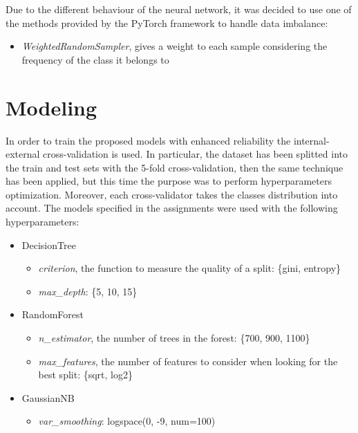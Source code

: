 \documentclass[../main]{subfiles}
\begin{document}
Due to the different behaviour of the neural network, it was decided to use one of the methods provided by the PyTorch framework to handle data imbalance:
\begin{itemize}
    \item \textit{WeightedRandomSampler}, gives a weight to each sample considering the frequency of the class it belongs to
\end{itemize}

\section{Modeling}
In order to train the proposed models with enhanced reliability the internal-external cross-validation is used.
In particular, the dataset has been splitted into the train and test sets with the 5-fold cross-validation, then the same technique has been applied, but this time the purpose was to perform hyperparameters optimization.
Moreover, each cross-validator takes the classes distribution into account.
The models specified in the assignments were used with the following hyperparameters:
\begin{itemize}
    \item DecisionTree
    \begin{itemize}
        \item \textit{criterion}, the function to measure the quality of a split: \{gini, entropy\}
        \item \textit{max\_depth}: \{5, 10, 15\}
    \end{itemize}
    \item RandomForest
    \begin{itemize}
        \item \textit{n\_estimator}, the number of trees in the forest: \{700, 900, 1100\}
        \item \textit{max\_features}, the number of features to consider when looking for the best split: \{sqrt, log2\}
    \end{itemize} 
\end{itemize}

\begin{itemize}
    \item GaussianNB
    \begin{itemize}
        \item \textit{var\_smoothing}: logspace(0, -9, num=100)
    \end{itemize}
\end{itemize}
\end{document}
